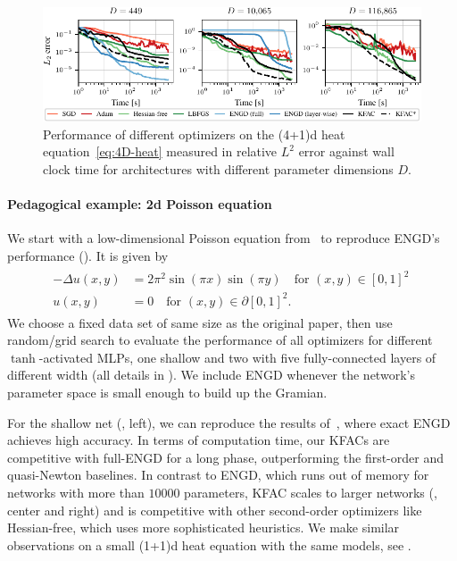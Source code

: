 \begin{figure}
  \centering
  \includegraphics{kfac_pinns_exp/exp30_heat4d_groupplot/l2_error_over_time.pdf}
  \caption{Performance of different optimizers on the (4+1)d heat equation~\eqref{eq:4D-heat} measured in relative $L^2$ error against wall clock time for architectures with different parameter dimensions $D$.}
  \label{fig:4D-heat}
\end{figure}

\paragraph{Pedagogical example: 2d Poisson equation}
We start with a low-dimensional Poisson equation from~\citet{muller2023achieving} to reproduce ENGD's performance ().
It is given by
\begin{align}\label{eq:2D-Poisson}
  \begin{split}
    -\Delta u(x,y)
    &=
      2\pi^2 \sin(\pi x) \sin(\pi y) \quad \text{for } (x,y)\in[0,1]^2\,
    \\
    u(x,y)
    &=
      0 \quad \text{for } (x,y) \in\partial[0,1]^2.
  \end{split}
\end{align}
We choose a fixed data set of same size as the original paper, then use random/grid search to evaluate the performance of all optimizers for different $\tanh$-activated MLPs, one shallow and two with five fully-connected layers of different width (all details in ).
We include ENGD whenever the network's parameter space is small enough to build up the Gramian.

For the shallow net (, left), we can reproduce the results of~\cite{muller2023achieving}, where exact ENGD achieves high accuracy.
In terms of computation time, our KFACs are competitive with full-ENGD for a long phase, outperforming the first-order and quasi-Newton baselines.
In contrast to ENGD, which runs out of memory for networks with more than $\num{10000}$ parameters, KFAC scales to larger networks (, center and right) and is competitive with other second-order optimizers like Hessian-free, which uses more sophisticated heuristics.
We make similar observations on a small (1+1)d heat equation with the same models, see .

